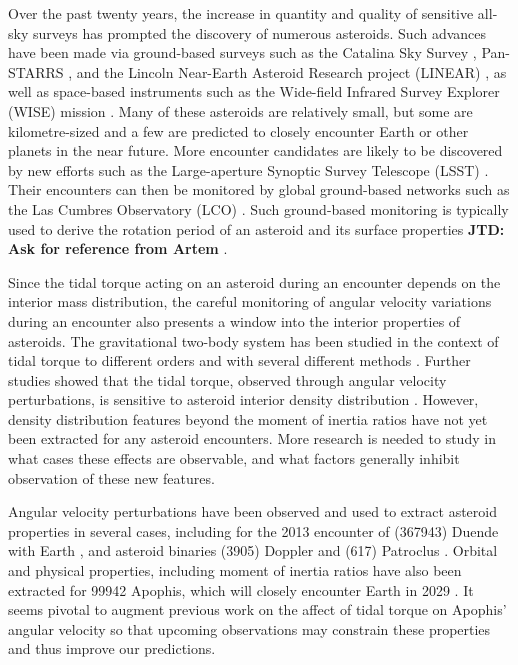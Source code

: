 \documentclass[fleqn,usenatbib]{mnras}
\newcommand{\jtd}[1]{ {\bf{\color{red} JTD: #1}} }
\begin{document}
Over the past twenty years, the increase in quantity and quality of sensitive all-sky surveys has prompted the discovery of numerous asteroids. Such advances have been made via ground-based surveys such as the Catalina Sky Survey \cite{larson1998catalina}, Pan-STARRS \cite{kaiser2002pan}, and the Lincoln Near-Earth Asteroid Research project (LINEAR) \cite{stokes2000lincoln}, as well as space-based instruments such as the Wide-field Infrared Survey Explorer (WISE) mission \cite{wright2010wide}. Many of these asteroids are relatively small, but some are kilometre-sized and a few are predicted to closely encounter Earth or other planets in the near future. More encounter candidates are likely to be discovered by new efforts such as the Large-aperture Synoptic Survey Telescope (LSST) \cite{tyson2002large}. Their encounters can then be monitored by global ground-based networks such as the Las Cumbres Observatory (LCO) \cite{brown2013cumbres}. Such ground-based monitoring is typically used to derive the rotation period of an asteroid and its surface properties \cite{}\jtd{Ask for reference from Artem}.

Since the tidal torque acting on an asteroid during an encounter depends on the interior mass distribution, the careful monitoring of angular velocity variations during an encounter also presents a window into the interior properties of asteroids. The gravitational two-body system has
been studied in the context of tidal torque to different orders
and with several different methods \cite{paul88, SCHEERES2000106, ashenberg07, BOUE2009750, HouMar2017}. Further studies showed that the tidal torque, observed through angular velocity perturbations, is sensitive to asteroid interior density distribution \cite{Naidu_2015, Makarov2022ChaosOO, RICHARDSON199847, scheeres2004evolution}. However, density distribution features beyond the moment of inertia ratios have not yet been extracted for any asteroid encounters. More research is needed to study in what cases these effects are observable, and what
factors generally inhibit observation of these new features. 

Angular velocity perturbations have been observed and
used to extract asteroid properties in several cases, including
for the 2013 encounter of (367943) Duende with Earth \cite{MOSKOVITZ2020113519, benson2020spin}, and asteroid
binaries (3905) Doppler and (617) Patroclus \cite{DESCAMPS2020113726, BERTHIER2020113990}. Orbital and physical properties, including moment of inertia ratios have also been extracted for 99942 Apophis, which will closely encounter Earth in 2029 \cite{yu2014numerical, hirabayashi2021finite, valvano2022apophis, Lee2022Apophis}. It seems pivotal to augment previous work on the affect of tidal torque on Apophis' angular velocity \cite{souchay2014rotational, souchay2018changes} so that upcoming observations may constrain these properties and thus improve our predictions.
\end{document}
